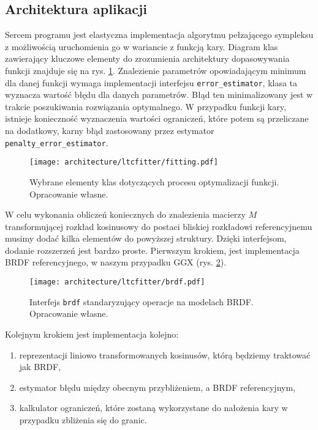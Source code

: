 \documentclass[../main.tex]{subfiles}
\newcommand{\graphvizscale}{0.09}
\begin{document}
\subsection{Architektura aplikacji}

Sercem programu jest elastyczna implementacja algorytmu pełzającego sympleksu z możliwością uruchomienia go w wariancie z funkcją kary. Diagram klas zawierający kluczowe elementy do zrozumienia architektury dopasowywania funkcji znajduje się na rys. \ref{fig:FunctionSolveClassDiagram}. Znalezienie parametrów opowiadającym minimum dla danej funkcji wymaga implementacji interfejsu \texttt{error\_estimator}, klasa ta wyznacza wartość błędu dla danych parametrów. Błąd ten minimalizowany jest w trakcie poszukiwania rozwiązania optymalnego. W przypadku funkcji kary, istnieje konieczność wyznaczenia wartości ograniczeń, które potem są przeliczane na dodatkowy, karny błąd zastosowany przez estymator \texttt{penalty\_error\_estimator}. 

\begin{figure}[h]
    \centering
    \texttt{[image: architecture/ltcfitter/fitting.pdf]}
    \caption{Wybrane elementy klas dotyczących procesu optymalizacji funkcji. Opracowanie własne.}
    \label{fig:FunctionSolveClassDiagram}
\end{figure}

W celu wykonania obliczeń koniecznych do znalezienia macierzy $M$ transformującej rozkład kosinusowy do postaci bliskiej rozkładowi referencyjnemu musimy dodać kilka elementów do powyższej struktury. Dzięki interfejsom, dodanie rozszerzeń jest bardzo proste. Pierwszym krokiem, jest implementacja BRDF referencyjnego, w naszym przypadku GGX (rys. \ref{fig:BRDFClassDiagram}).

\begin{figure}[h]
    \centering
    \texttt{[image: architecture/ltcfitter/brdf.pdf]}
    \caption{Interfejs \texttt{brdf} standaryzujący operacje na modelach BRDF. Opracowanie własne.}
    \label{fig:BRDFClassDiagram}
\end{figure}

Kolejnym krokiem jest implementacja kolejno: 
\begin{enumerate}
    \item reprezentacji liniowo transformowanych kosinusów, którą będziemy traktować jak BRDF,
    \item estymator błędu między obecnym przybliżeniem, a BRDF referencyjnym,
    \item kalkulator ograniczeń, które zostaną wykorzystane do nałożenia kary w przypadku zbliżenia się do granic.
\end{enumerate}
\end{document}
